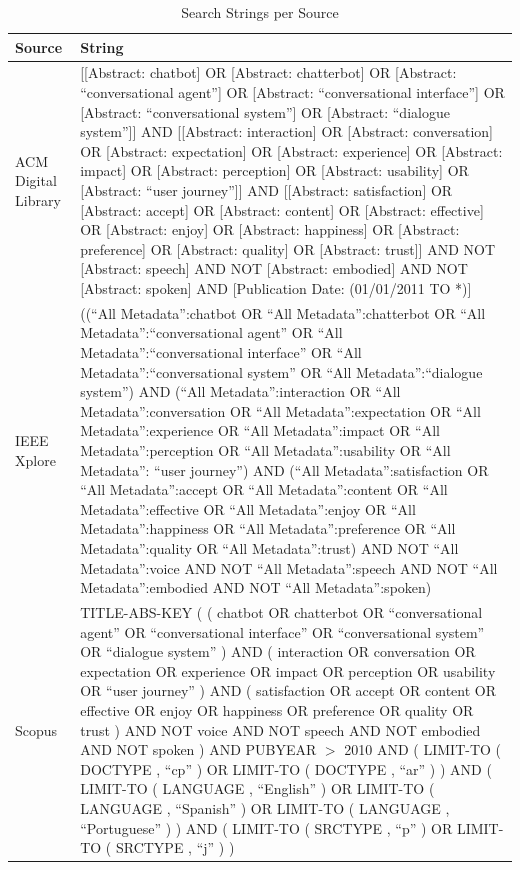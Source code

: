 \begin{table}[htbp]
 \centering
 \caption{Search Strings per Source}
 \label{tab:strings}
 \footnotesize
 \begin{tabular}{p{1.5cm}p{12.5cm}}
    \hline
    Source & String \\
    \hline
    ACM Digital Library & [[Abstract: chatbot] OR [Abstract: chatterbot] OR [Abstract: ``conversational agent''] OR [Abstract: ``conversational interface''] OR [Abstract: ``conversational system''] OR [Abstract: ``dialogue system'']] AND [[Abstract: interaction] OR [Abstract: conversation] OR [Abstract: expectation] OR [Abstract: experience] OR [Abstract: impact] OR [Abstract: perception] OR [Abstract: usability] OR [Abstract: ``user journey'']] AND [[Abstract: satisfaction] OR [Abstract: accept] OR [Abstract: content] OR [Abstract: effective] OR [Abstract: enjoy] OR [Abstract: happiness] OR [Abstract: preference] OR [Abstract: quality] OR [Abstract: trust]] AND NOT [Abstract: speech] AND NOT [Abstract: embodied] AND NOT [Abstract: spoken] AND [Publication Date: (01/01/2011 TO *)] \\
    IEEE Xplore & ((``All Metadata'':chatbot OR ``All Metadata'':chatterbot OR ``All Metadata'':``conversational agent'' OR ``All Metadata'':``conversational interface'' OR ``All Metadata'':``conversational system'' OR ``All Metadata'':``dialogue system'') AND (``All Metadata'':interaction OR ``All Metadata'':conversation OR ``All Metadata'':expectation OR ``All Metadata'':experience OR ``All Metadata'':impact OR ``All Metadata'':perception OR ``All Metadata'':usability OR ``All Metadata'': ``user journey'') AND (``All Metadata'':satisfaction OR ``All Metadata'':accept OR ``All Metadata'':content OR ``All Metadata'':effective OR ``All Metadata'':enjoy OR ``All Metadata'':happiness OR ``All Metadata'':preference OR ``All Metadata'':quality OR ``All Metadata'':trust) AND NOT ``All Metadata'':voice AND NOT ``All Metadata'':speech AND NOT ``All Metadata'':embodied AND NOT ``All Metadata'':spoken)
    \\
    Scopus & TITLE-ABS-KEY ( ( chatbot  OR  chatterbot  OR  ``conversational agent''  OR  ``conversational interface''  OR  ``conversational system''  OR  ``dialogue system'' )  AND  ( interaction  OR  conversation  OR  expectation  OR  experience  OR  impact  OR  perception  OR  usability  OR  ``user journey'' )  AND  ( satisfaction  OR  accept  OR  content  OR  effective  OR  enjoy  OR  happiness  OR  preference  OR  quality  OR  trust )  AND NOT  voice  AND NOT  speech  AND NOT  embodied  AND NOT  spoken )  AND  PUBYEAR  $>$ 2010  AND  ( LIMIT-TO ( DOCTYPE ,  ``cp'' )  OR  LIMIT-TO ( DOCTYPE ,  ``ar'' ) )  AND  ( LIMIT-TO ( LANGUAGE ,  ``English'' )  OR  LIMIT-TO ( LANGUAGE ,  ``Spanish'' )  OR  LIMIT-TO ( LANGUAGE ,  ``Portuguese'' ) )  AND  ( LIMIT-TO ( SRCTYPE ,  ``p'' )  OR  LIMIT-TO ( SRCTYPE ,  ``j'' ) )  \\
  \hline
\end{tabular}
\end{table}

